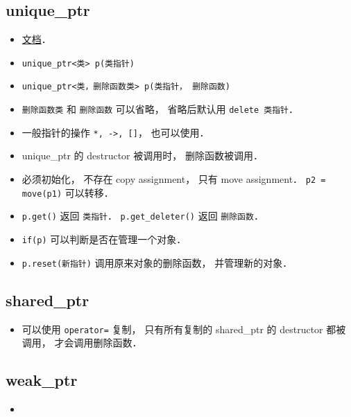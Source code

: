
\begin{issues}
\issueDraft
\end{issues}

\subsection{unique_ptr}
\begin{itemize}
\item \href{https://en.cppreference.com/w/cpp/memory/unique_ptr}{文档}．
\item \verb|unique_ptr<类> p(类指针)|
\item \verb|unique_ptr<类，删除函数类> p(类指针， 删除函数)|
\item \verb|删除函数类| 和 \verb|删除函数| 可以省略， 省略后默认用 \verb|delete 类指针|．
\item 一般指针的操作 \verb|*, ->, []|， 也可以使用．
\item unique_ptr 的 destructor 被调用时， 删除函数被调用．
\item 必须初始化， 不存在 copy assignment， 只有 move assignment． \verb|p2 = move(p1)| 可以转移．
\item \verb|p.get()| 返回 \verb|类指针|． \verb|p.get_deleter()| 返回 \verb|删除函数|．
\item \verb|if(p)| 可以判断是否在管理一个对象．
\item \verb|p.reset(新指针)| 调用原来对象的删除函数， 并管理新的对象．
\end{itemize}

\subsection{shared_ptr}
\begin{itemize}
\item 可以使用 \verb|operator=| 复制， 只有所有复制的 shared_ptr 的 destructor 都被调用， 才会调用删除函数．
\end{itemize}

\subsection{weak_ptr}
\begin{itemize}
\item 
\end{itemize}
